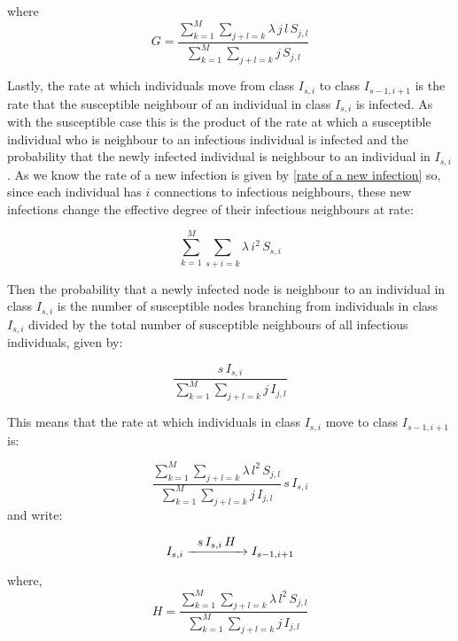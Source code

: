 \documentclass{uonmathsreport}
\begin{document}
\noindent
where
\begin{equation} \label{G}
G=\frac{\sum_{k=1}^{M}\sum_{j+l=k}\lambda\,j\,l\,S_{j,l}}{\sum_{k=1}^{M}\sum_{j+l=k}j\,S_{j,l}}
\end{equation}


Lastly, the rate at which individuals move from class $I_{s,i}$ to class $I_{s-1,i+1}$ is the rate that the susceptible neighbour of an individual in class $I_{s,i}$ is infected. As with the susceptible case this is the product of the rate at which a susceptible individual who is neighbour to an infectious individual is infected and the probability that the newly infected individual is neighbour to an individual in $I_{s,i}$. As we know the rate of a new infection is given by \eqref{rate of a new infection} so, since each individual has $i$ connections to infectious neighbours, these new infections change the effective degree of their infectious neighbours at rate:

\begin{equation} \label{rate at which a new infection changes infectious neighbour degree}
\sum_{k=1}^{M}\sum_{s+i=k}\lambda\,{i}^2\,S_{s,i}
\end{equation}

Then the probability that a newly infected node is neighbour to an individual in class $I_{s,i}$ is the number of susceptible nodes branching from individuals in class $I_{s,i}$ divided by the total number of susceptible neighbours of all infectious individuals, given by:

\begin{equation}
\frac{s\,I_{s,i}}{\sum_{k=1}^{M}\sum_{j+l=k}j\,I_{j,l}}
\end{equation}

\noindent
This means that the rate at which individuals in class $I_{s,i}$ move to class $I_{s-1,i+1}$ is:

\begin{equation}
\frac{\sum_{k=1}^{M}\sum_{j+l=k}\lambda\,{l}^2\,S_{j,l}}{\sum_{k=1}^{M}\sum_{j+l=k}j\,I_{j,l}}\,s\,I_{s,i}
\end{equation}
and write:

\begin{equation}
I_{s,i}\xrightarrow{\makebox[1.5cm]{$s\,I_{s,i}\,H$}}I_{s-1,i+1}
\end{equation}

\noindent
where,
\begin{equation} \label{H}
H=\frac{\sum_{k=1}^{M}\sum_{j+l=k}\lambda\,{l}^2\,S_{j,l}}{\sum_{k=1}^{M}\sum_{j+l=k}j\,I_{j,l}}
\end{equation}
\end{document}
